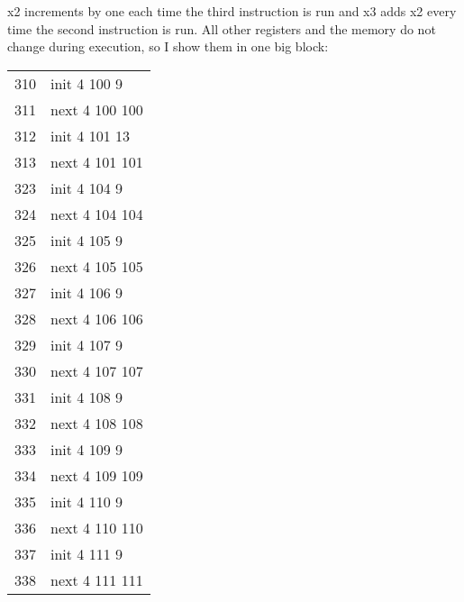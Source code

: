 x2 increments by one each time the third instruction is run and x3
adds x2 every time the second instruction is run. All other registers
and the memory do not change during execution, so I show them in one
big block:
\begin{center}
        \begin{tabular}[h!]{>{\ttfamily\color{UniRed}}r >{\ttfamily}l }
                310 & init \color{UniGrey} 4 \color{UniRed} 100 9   \\
                311 & next \color{UniGrey} 4 \color{UniRed} 100 100 \\
                312 & init \color{UniGrey} 4 \color{UniRed} 101 13  \\
                313 & next \color{UniGrey} 4 \color{UniRed} 101 101 \\
                323 & init \color{UniGrey} 4 \color{UniRed} 104 9   \\
                324 & next \color{UniGrey} 4 \color{UniRed} 104 104 \\
                325 & init \color{UniGrey} 4 \color{UniRed} 105 9   \\
                326 & next \color{UniGrey} 4 \color{UniRed} 105 105 \\
                327 & init \color{UniGrey} 4 \color{UniRed} 106 9   \\
                328 & next \color{UniGrey} 4 \color{UniRed} 106 106 \\
                329 & init \color{UniGrey} 4 \color{UniRed} 107 9   \\
                330 & next \color{UniGrey} 4 \color{UniRed} 107 107 \\
                331 & init \color{UniGrey} 4 \color{UniRed} 108 9   \\
                332 & next \color{UniGrey} 4 \color{UniRed} 108 108 \\
                333 & init \color{UniGrey} 4 \color{UniRed} 109 9   \\
                334 & next \color{UniGrey} 4 \color{UniRed} 109 109 \\
                335 & init \color{UniGrey} 4 \color{UniRed} 110 9   \\
                336 & next \color{UniGrey} 4 \color{UniRed} 110 110 \\
                337 & init \color{UniGrey} 4 \color{UniRed} 111 9   \\
                338 & next \color{UniGrey} 4 \color{UniRed} 111 111 \\

\end{tabular}
\end{center}

